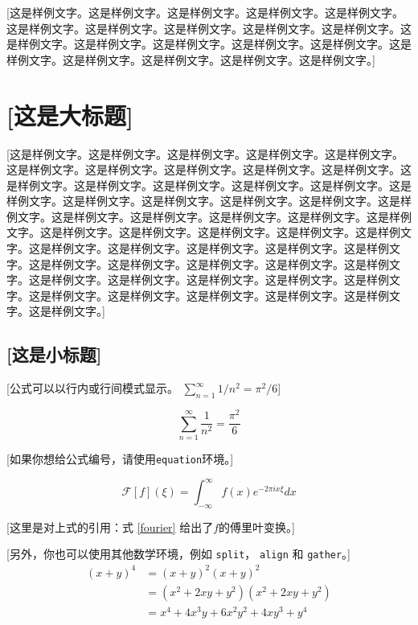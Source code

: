 \documentclass[a4paper,11pt,onecolumn,twoside]{article}
\begin{document}
[这是样例文字。这是样例文字。这是样例文字。这是样例文字。这是样例文字。这是样例文字。这是样例文字。这是样例文字。这是样例文字。这是样例文字。这是样例文字。这是样例文字。这是样例文字。这是样例文字。这是样例文字。这是样例文字。这是样例文字。这是样例文字。这是样例文字。这是样例文字。]

\section{[这是大标题]}
[这是样例文字。这是样例文字。这是样例文字。这是样例文字。这是样例文字。这是样例文字。这是样例文字。这是样例文字。这是样例文字。这是样例文字。这是样例文字。这是样例文字。这是样例文字。这是样例文字。这是样例文字。这是样例文字。这是样例文字。这是样例文字。这是样例文字。这是样例文字。这是样例文字。这是样例文字。这是样例文字。这是样例文字。这是样例文字。这是样例文字。这是样例文字。这是样例文字。这是样例文字。这是样例文字。这是样例文字。这是样例文字。这是样例文字。这是样例文字。这是样例文字。这是样例文字。这是样例文字。这是样例文字。这是样例文字。这是样例文字。这是样例文字。这是样例文字。这是样例文字。这是样例文字。这是样例文字。这是样例文字。这是样例文字。这是样例文字。这是样例文字。这是样例文字。这是样例文字。这是样例文字。]

\subsection{[这是小标题]}
[公式可以以行内或行间模式显示。 $\sum_{n = 1} ^ {\infty} 1/n^2 = \pi^2/6 $]

$$ \sum_{n=1}^{\infty} \frac{1}{n^2} = \frac{\pi^2}{6} $$

[如果你想给公式编号，请使用\texttt{equation}环境。]

  \begin{equation} \label{fourier}
    \mathcal{F}[f](\xi) = \int_{-\infty}^{\infty} f(x) e^{-2\pi ix \xi} dx
  \end{equation}

[这里是对上式的引用：式 \ref{fourier} 给出了$f$的傅里叶变换。]

  [另外，你也可以使用其他数学环境，例如 \texttt{split}， \texttt{align} 和 \texttt{gather}。]
  \begin{equation}
  \begin{split}
    (x+y)^4 &= (x+y)^2 (x+y)^2 \\
            &= (x^2+2xy+y^2)(x^2+2xy+y^2) \\
            &= x^4 + 4x^3y+6x^2y^2+4xy^3+y^4
  \end{split}
  \end{equation}
\end{document}
